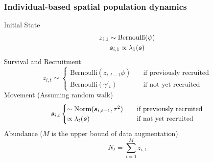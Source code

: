 \documentclass[color=usenames,dvipsnames]{beamer}
\begin{document}




\begin{frame}
  \frametitle{\Large Individual-based spatial population dynamics}
  {Initial State}
  \begin{gather*}
    z_{i,1} \sim \mbox{Bernoulli}(\psi) \\
    {\bm s}_{i,1} \propto \lambda_1({\bm s})
  \end{gather*}
  \vfill
  Survival and Recruitment
  \[
    z_{i,t} \sim
    \begin{cases}
      \mbox{Bernoulli}(z_{i,t-1}\phi) & \quad \text{if previously recruited} \\
      \mbox{Bernoulli}(\gamma'_t) & \quad \text{if not yet recruited} 
    \end{cases}
  \]
  \vfill
  Movement (Assuming random walk)
  \[
    \bsit %
    \begin{cases}
      \sim \mbox{Norm}(\bsitp, \tau^2) & \quad \text{if previously recruited} \\
      \propto \lambda_t(\bs) & \quad \text{if not yet recruited} 
    \end{cases}
  \]
  \vfill
  Abundance ($M$ is the upper bound of data augmentation)
  \[
    N_t = \sum_{i=1}^M z_{i,t}
  \]
\end{frame}
\end{document}
